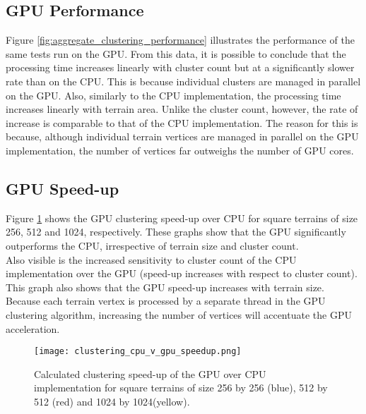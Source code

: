 \subsection{GPU Performance}

Figure \ref{fig:aggregate_clustering_performance} illustrates the performance of the same tests run on the GPU. From this data, it is possible to conclude that the processing time increases linearly with cluster count but at a significantly slower rate than on the CPU. This is because individual clusters are managed in parallel on the GPU. Also, similarly to the CPU implementation, the processing time increases linearly with terrain area. Unlike the cluster count, however, the rate of increase is comparable to that of the CPU implementation. The reason for this is because, although individual terrain vertices are managed in parallel on the GPU implementation, the number of vertices far outweighs the number of GPU cores. 

\subsection{GPU Speed-up}

Figure \ref{fig:clustering_cpu_v_gpu_speedup} shows the GPU clustering speed-up over CPU for square terrains of size 256, 512 and 1024, respectively. These graphs show that the GPU significantly outperforms the CPU, irrespective of terrain size and cluster count. \\
Also visible is the increased sensitivity to cluster count of the CPU implementation over the GPU (speed-up increases with respect to cluster count). \\
This graph also shows that the GPU speed-up increases with terrain size. Because each terrain vertex is processed by a separate thread in the GPU clustering algorithm, increasing the number of vertices will accentuate the GPU acceleration. \\

\begin{figure}
\center
	\texttt{[image: clustering\_cpu\_v\_gpu\_speedup.png]}
	\caption{ Calculated clustering speed-up of the GPU over CPU implementation for square terrains of size 256 by 256 (blue), 512 by 512 (red) and 1024 by 1024(yellow).}	
	\label{fig:clustering_cpu_v_gpu_speedup}
\end{figure}
